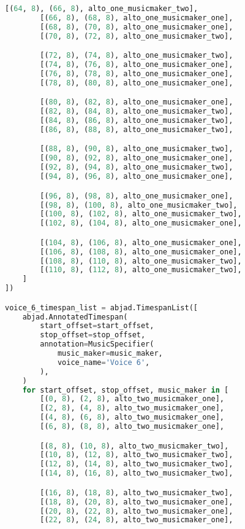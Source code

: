 \begin{lstlisting}[language=Python, caption=Invocation Source Code]
        [(64, 8), (66, 8), alto_one_musicmaker_two],
        [(66, 8), (68, 8), alto_one_musicmaker_one],
        [(68, 8), (70, 8), alto_one_musicmaker_one],
        [(70, 8), (72, 8), alto_one_musicmaker_two],

        [(72, 8), (74, 8), alto_one_musicmaker_two],
        [(74, 8), (76, 8), alto_one_musicmaker_one],
        [(76, 8), (78, 8), alto_one_musicmaker_one],
        [(78, 8), (80, 8), alto_one_musicmaker_one],

        [(80, 8), (82, 8), alto_one_musicmaker_one],
        [(82, 8), (84, 8), alto_one_musicmaker_two],
        [(84, 8), (86, 8), alto_one_musicmaker_two],
        [(86, 8), (88, 8), alto_one_musicmaker_two],

        [(88, 8), (90, 8), alto_one_musicmaker_two],
        [(90, 8), (92, 8), alto_one_musicmaker_one],
        [(92, 8), (94, 8), alto_one_musicmaker_two],
        [(94, 8), (96, 8), alto_one_musicmaker_one],

        [(96, 8), (98, 8), alto_one_musicmaker_one],
        [(98, 8), (100, 8), alto_one_musicmaker_two],
        [(100, 8), (102, 8), alto_one_musicmaker_two],
        [(102, 8), (104, 8), alto_one_musicmaker_one],

        [(104, 8), (106, 8), alto_one_musicmaker_one],
        [(106, 8), (108, 8), alto_one_musicmaker_one],
        [(108, 8), (110, 8), alto_one_musicmaker_two],
        [(110, 8), (112, 8), alto_one_musicmaker_two],
    ]
])

voice_6_timespan_list = abjad.TimespanList([
    abjad.AnnotatedTimespan(
        start_offset=start_offset,
        stop_offset=stop_offset,
        annotation=MusicSpecifier(
            music_maker=music_maker,
            voice_name='Voice 6',
        ),
    )
    for start_offset, stop_offset, music_maker in [
        [(0, 8), (2, 8), alto_two_musicmaker_one],
        [(2, 8), (4, 8), alto_two_musicmaker_one],
        [(4, 8), (6, 8), alto_two_musicmaker_one],
        [(6, 8), (8, 8), alto_two_musicmaker_one],

        [(8, 8), (10, 8), alto_two_musicmaker_two],
        [(10, 8), (12, 8), alto_two_musicmaker_two],
        [(12, 8), (14, 8), alto_two_musicmaker_two],
        [(14, 8), (16, 8), alto_two_musicmaker_two],

        [(16, 8), (18, 8), alto_two_musicmaker_two],
        [(18, 8), (20, 8), alto_two_musicmaker_one],
        [(20, 8), (22, 8), alto_two_musicmaker_one],
        [(22, 8), (24, 8), alto_two_musicmaker_one],


\end{lstlisting}
